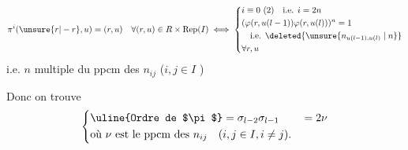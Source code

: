 \[
\pi^i(\unsure{r|-r},u)=(r,u)\quad\forall(r,u)\in R\times\operatorname{Rep}(I)
\iff\left\{\begin{aligned}
&i\equiv0\ (2)\quad\text{i.e. }i=2n\\
&(\varphi(r,u(l-1))\varphi(r,u(l)))^n=1\\
&\hspace{1em}\text{i.e. }\deleted{\unsure{n_{u(l-1),u(l)}\mid n}}\\
&\forall r,u
\end{aligned}\right.
\]
i.e. $n$ multiple du ppcm  des $n_{ij}$ ($i,j\in I$ )

Donc on trouve
\[
\left\{\begin{aligned}
&\text{\uline{Ordre de $\pi$}}=\sigma_{l-2}\sigma_{l-1}\qquad=2\nu\\
&\text{où }\nu\text{ est le ppcm des }n_{ij}\quad(i,j\in I,i\ne j).
\end{aligned}\right.
\]

